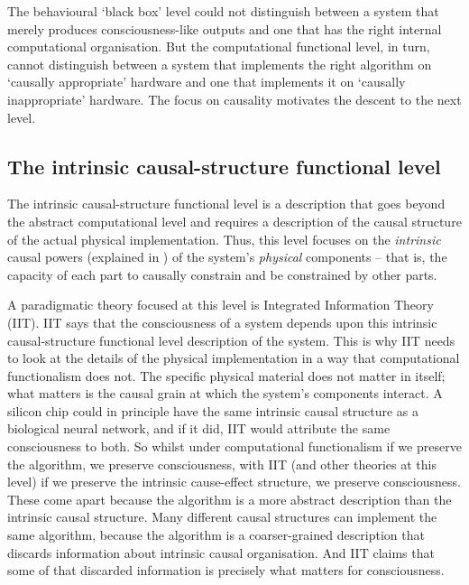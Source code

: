 \documentclass[11pt, a4paper, onecolumn, gdm]{google}
\begin{document}
The behavioural `black box' level could not distinguish between a system that merely produces consciousness-like outputs and one that has the right internal computational organisation.
But the computational functional level, in turn, cannot distinguish between a system that implements the right algorithm on `causally appropriate' hardware and one that implements it on `causally inappropriate' hardware.
The focus on causality motivates the descent to the next level.

\subsection{The intrinsic causal-structure functional level}\label{the-intrinsic-causal-structure-functional-level}

The intrinsic causal-structure functional level is a description that goes beyond the abstract computational level and requires a description of the causal structure of the actual physical implementation.
Thus, this level focuses on the \emph{intrinsic} causal powers (explained in ) of the system's \emph{physical} components -- that is, the capacity of each part to causally constrain and be constrained by other parts.

A paradigmatic theory focused at this level is Integrated Information Theory (IIT).
IIT says that the consciousness of a system depends upon this intrinsic causal-structure functional level description of the system.
This is why IIT needs to look at the details of the physical implementation in a way that computational functionalism does not.
The specific physical material does not matter in itself; what matters is the causal grain at which the system's components interact.
A silicon chip could in principle have the same intrinsic causal structure as a biological neural network, and if it did, IIT would attribute the same consciousness to both.
So whilst under computational functionalism if we preserve the algorithm, we preserve consciousness, with IIT (and other theories at this level) if we preserve the intrinsic cause-effect structure, we preserve consciousness.
These come apart because the algorithm is a more abstract description than the intrinsic causal structure.
Many different causal structures can implement the same algorithm, because the algorithm is a coarser-grained description that discards information about intrinsic causal organisation.
And IIT claims that some of that discarded information is precisely what matters for consciousness.
\end{document}
